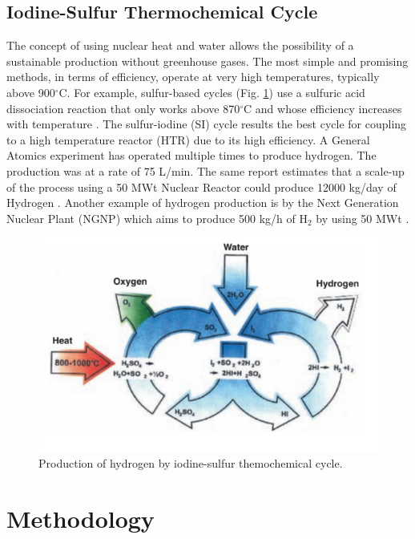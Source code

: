 \documentclass{anstrans}
\begin{document}
\subsection{Iodine-Sulfur Thermochemical Cycle}

The concept of using nuclear heat and water allows the possibility of a sustainable production without greenhouse gases. The most simple and promising methods, in terms of efficiency, operate at very high temperatures, typically above 900$^{\circ}$C. For example, sulfur-based cycles (Fig. \ref{fig:isulfur}) use a sulfuric acid dissociation reaction that only works above 870$^{\circ}$C and whose efficiency increases with temperature \cite{cea_gas-cooled_2006}. The sulfur-iodine (SI) cycle results the best cycle for coupling to a high temperature reactor (HTR) due to its high efficiency. A General Atomics experiment has operated multiple times to produce hydrogen. The production was at a rate of 75 L/min. The same report estimates that a scale-up of the process using a 50 MWt Nuclear Reactor could produce 12000 kg/day of Hydrogen \cite{benjamin_russ_sulfur_2009}.
Another example of hydrogen production is by the Next Generation Nuclear Plant (NGNP) \cite{macdonald_ngnp_2003} which aims to produce 500 kg/h of H$_2$ by using 50 MWt \cite{cea_gas-cooled_2006}.

\begin{figure}[H]
	\centering
	\includegraphics[width=0.85\linewidth]{figures/iodine-sulfur.png}
	\hfill
	\caption{Production of hydrogen by iodine-sulfur themochemical cycle.}
	\label{fig:isulfur}
\end{figure}

\section{Methodology}
\label{method}
\end{document}
